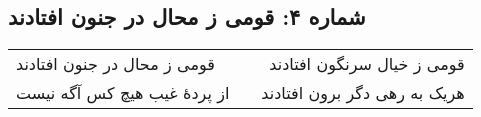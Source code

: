 \begin{center}
\section*{شماره ۴: قومی ز محال در جنون افتادند}
\label{sec:004}
\begin{longtable}{l p{0.5cm} r}
قومی ز محال در جنون افتادند
&&
قومی ز خیال سرنگون افتادند
\\
از پردهٔ غیب هیچ کس آگه نیست
&&
هریک به رهی دگر برون افتادند
\\
\end{longtable}
\end{center}
